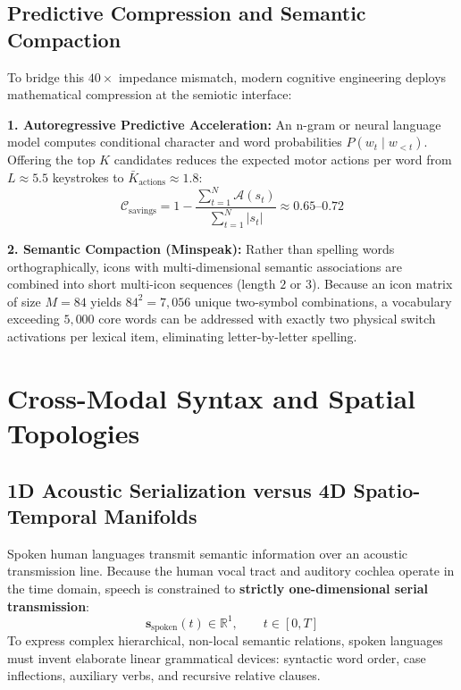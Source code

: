 \documentclass[11pt,letterpaper]{article}
\begin{document}
\subsection{Predictive Compression and Semantic Compaction}
To bridge this $40\times$ impedance mismatch, modern cognitive engineering deploys mathematical compression at the semiotic interface:

\textbf{1. Autoregressive Predictive Acceleration:} An n-gram or neural language model computes conditional character and word probabilities $P(w_t \mid w_{<t})$. Offering the top $K$ candidates reduces the expected motor actions per word from $L \approx 5.5$ keystrokes to $\bar{K}_{\text{actions}} \approx 1.8$:
\begin{equation}
\mathcal{C}_{\text{savings}} = 1 - \frac{\sum_{t=1}^N \mathcal{A}(s_t)}{\sum_{t=1}^N |s_t|} \approx 0.65\text{--}0.72
\end{equation}

\textbf{2. Semantic Compaction (Minspeak):} Rather than spelling words orthographically, icons with multi-dimensional semantic associations are combined into short multi-icon sequences (length $2$ or $3$). Because an icon matrix of size $M = 84$ yields $84^2 = 7{,}056$ unique two-symbol combinations, a vocabulary exceeding $5{,}000$ core words can be addressed with exactly two physical switch activations per lexical item, eliminating letter-by-letter spelling.

\section{Cross-Modal Syntax and Spatial Topologies}

\subsection{1D Acoustic Serialization versus 4D Spatio-Temporal Manifolds}
Spoken human languages transmit semantic information over an acoustic transmission line. Because the human vocal tract and auditory cochlea operate in the time domain, speech is constrained to \textbf{strictly one-dimensional serial transmission}:
\begin{equation}
\mathbf{s}_{\text{spoken}}(t) \in \mathbb{R}^1, \qquad t \in [0, T]
\end{equation}
To express complex hierarchical, non-local semantic relations, spoken languages must invent elaborate linear grammatical devices: syntactic word order, case inflections, auxiliary verbs, and recursive relative clauses.
\end{document}
